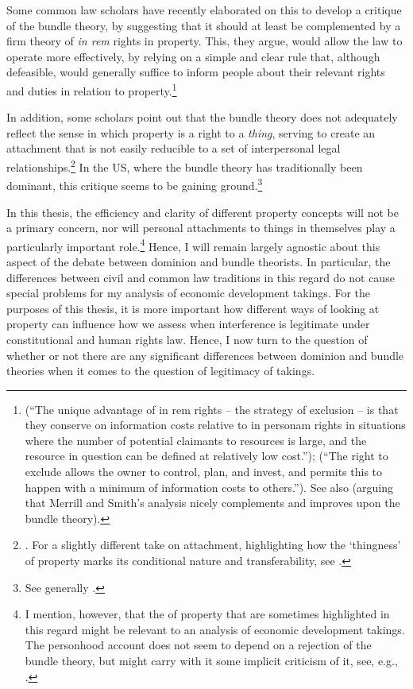 Some common law scholars have recently elaborated on this to develop a critique of the bundle theory, by suggesting that it should at least be complemented by a firm theory of {\it in rem} rights in property. This, they argue, would allow the law to operate more effectively, by relying on a simple and clear rule that, although defeasible, would generally suffice to inform people about their relevant rights and duties in relation to property.\footnote{\cite[793]{merrill01b} (``The unique advantage of in rem rights -- the strategy of exclusion -- is that they conserve on information costs relative to in personam rights in situations where the number of potential claimants to resources is large, and the resource in question can be defined at relatively low cost.''); \cite[389]{merrill01} (``The right to exclude allows the owner to control, plan, and invest, and permits this to happen with a minimum of information costs to others.''). See also \cite{ellickson11} (arguing that Merrill and Smith's analysis nicely complements and improves upon the bundle theory).} 

In addition, some scholars point out that the bundle theory does not adequately reflect the sense in which property is a right to a {\it thing}, serving to create an attachment that is not easily reducible to a set of interpersonal legal relationships.\footnote{\cite[1862]{merrill07}. For a slightly different take on attachment, highlighting how the `thingness' of property marks its conditional nature and transferability, see \cite[799-818]{penner96}.} In the US, where the bundle theory has traditionally been dominant, this critique seems to be gaining ground.\footnote{See generally \cite{klein11}.}

In this thesis, the efficiency and clarity of different property concepts will not be a primary concern, nor will personal attachments to things in themselves play a particularly important role.\footnote{I mention, however, that the  of property that are sometimes highlighted in this regard might be relevant to an analysis of economic development takings. The personhood account does not seem to depend on a rejection of the bundle theory, but might carry with it some implicit criticism of it, see, e.g., \cite[127-130]{radin93}.} Hence, I will remain largely agnostic about this aspect of the debate between dominion and bundle theorists. In particular, the differences between civil and common law traditions in this regard do not cause special problems for my analysis of economic development takings. For the purposes of this thesis, it is more important how different ways of looking at property can influence how we assess when interference is legitimate under constitutional and human rights law. Hence, I now turn to the question of whether or not there are any significant differences between dominion and bundle theories when it comes to the question of legitimacy of takings.

